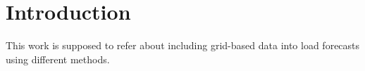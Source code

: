 \chapter{Introduction}
\label{ch:Introduction}






This work is supposed to refer about including grid-based data into load forecasts using different methods.\\
